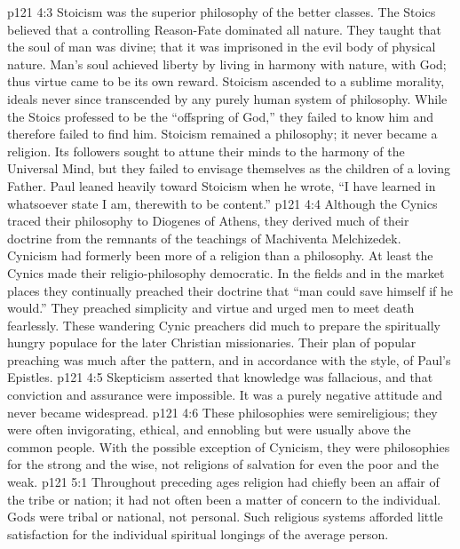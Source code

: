 \pc \vs p121 4:3 \bibnobreakspace {} Stoicism was the superior philosophy of the better classes. The Stoics believed that a controlling Reason\hyp{}Fate dominated all nature. They taught that the soul of man was divine; that it was imprisoned in the evil body of physical nature. Man’s soul achieved liberty by living in harmony with nature, with God; thus virtue came to be its own reward. Stoicism ascended to a sublime morality, ideals never since transcended by any purely human system of philosophy. While the Stoics professed to be the “offspring of God,” they failed to know him and therefore failed to find him. Stoicism remained a philosophy; it never became a religion. Its followers sought to attune their minds to the harmony of the Universal Mind, but they failed to envisage themselves as the children of a loving Father. Paul leaned heavily toward Stoicism when he wrote, “I have learned in whatsoever state I am, therewith to be content.”\plusone
\pc \vs p121 4:4 \bibnobreakspace {} Although the Cynics traced their philosophy to Diogenes of Athens, they derived much of their doctrine from the remnants of the teachings of Machiventa Melchizedek. Cynicism had formerly been more of a religion than a philosophy. At least the Cynics made their religio\hyp{}philosophy democratic. In the fields and in the market places they continually preached their doctrine that “man could save himself if he would.” They preached simplicity and virtue and urged men to meet death fearlessly. These wandering Cynic preachers did much to prepare the spiritually hungry populace for the later Christian missionaries. Their plan of popular preaching was much after the pattern, and in accordance with the style, of Paul’s Epistles.\plusone
\pc \vs p121 4:5 \bibnobreakspace {} Skepticism asserted that knowledge was fallacious, and that conviction and assurance were impossible. It was a purely negative attitude and never became widespread.
\pc \vs p121 4:6 These philosophies were semireligious; they were often invigorating, ethical, and ennobling but were usually above the common people. With the possible exception of Cynicism, they were philosophies for the strong and the wise, not religions of salvation for even the poor and the weak.
\vs p121 5:1 Throughout preceding ages religion had chiefly been an affair of the tribe or nation; it had not often been a matter of concern to the individual. Gods were tribal or national, not personal. Such religious systems afforded little satisfaction for the individual spiritual longings of the average person.
